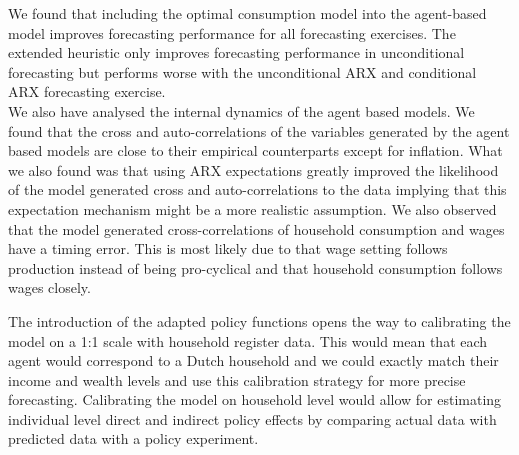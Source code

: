 We found that including the optimal consumption model into the agent-based model improves forecasting performance for all forecasting exercises. The extended heuristic only improves forecasting performance in unconditional forecasting but performs worse with the unconditional ARX and conditional ARX forecasting exercise. \\

We also have analysed the internal dynamics of the agent based models. We found that the cross and auto-correlations of the variables generated by the agent based models are close to their empirical counterparts except for inflation. What we also found was that using ARX expectations greatly improved the likelihood of the model generated cross and auto-correlations to the data implying that this expectation mechanism might be a more realistic assumption. We also observed that the model generated cross-correlations of household consumption and wages have a timing error. This is most likely due to that wage setting follows production instead of being pro-cyclical and that household consumption follows wages closely.

The introduction of the adapted policy functions opens the way to calibrating the model on a 1:1 scale with household register data. This would mean that each agent would correspond to a Dutch household and we could exactly match their income and wealth levels and use this calibration strategy for more precise forecasting. Calibrating the model on household level would allow for estimating individual level direct and indirect policy effects by comparing actual data with predicted data with a policy experiment. 